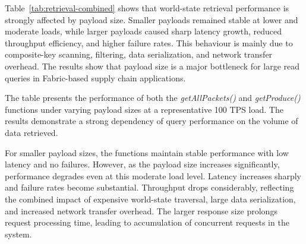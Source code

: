 \documentclass[manuscript,screen]{acmart}
\begin{document}
\begin{table}[h]
	\centering
	\caption{Performance Results for \texttt{getPacketLifecycle} (Payload: 2908 bytes) under Varying Load}
	\label{tab:getpacketlifecycle-loadtest}
\end{table}

Table~\ref{tab:retrieval-combined} shows that world-state retrieval performance is strongly affected by payload size. Smaller payloads remained stable at lower and moderate loads, while larger payloads caused sharp latency growth, reduced throughput efficiency, and higher failure rates. This behaviour is mainly due to composite-key scanning, filtering, data serialization, and network transfer overhead. The results show that payload size is a major bottleneck for large read queries in Fabric-based supply chain applications.

The table presents the performance of both the \textit{getAllPackets()} and \textit{getProduce()} functions under varying payload sizes at a representative 100 TPS load. The results demonstrate a strong dependency of query performance on the volume of data retrieved.

For smaller payload sizes, the functions maintain stable performance with low latency and no failures. However, as the payload size increases significantly, performance degrades even at this moderate load level. Latency increases sharply and failure rates become substantial. Throughput drops considerably, reflecting the combined impact of expensive world-state traversal, large data serialization, and increased network transfer overhead. The larger response size prolongs request processing time, leading to accumulation of concurrent requests in the system.
\end{document}
